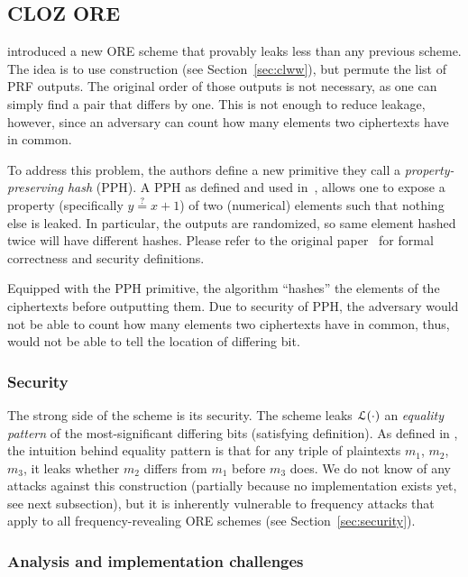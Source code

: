\subsection{CLOZ ORE}

	\textcite{parameter-hiding-ore} introduced a new ORE scheme that provably leaks less than any previous scheme.
	The idea is to use \textcite{clww-ore} construction (see Section~\ref{sec:clww}), but permute the list of PRF outputs.
	The original order of those outputs is not necessary, as one can simply find a pair that differs by one.
	This is not enough to reduce leakage, however, since an adversary can count how many elements two ciphertexts have in common.

	To address this problem, the authors define a new primitive they call a \emph{property-preserving hash} (PPH).
	A PPH as defined and used in~\cite{parameter-hiding-ore}, allows one to expose a property (specifically $y \overset{?}{=} x + 1$) of two (numerical) elements such that nothing else is leaked.
	In particular, the outputs are randomized, so same element hashed twice will have different hashes.
	Please refer to the original paper~\cite{parameter-hiding-ore} for formal correctness and security definitions.

	Equipped with the PPH primitive, the algorithm ``hashes'' the elements of the ciphertexts before outputting them.
	Due to security of PPH, the adversary would not be able to count how many elements two ciphertexts have in common, thus, would not be able to tell the location of differing bit.

	\subsubsection{Security}
		The strong side of the scheme is its security.
		The scheme leaks $\mathcal{L}(\cdot)$ an \emph{equality pattern} of the most-significant differing bits (satisfying \textcite{clww-ore} definition).
		As defined in \cite{parameter-hiding-ore}, the intuition behind equality pattern is that for any triple of plaintexts $m_1$, $m_2$, $m_3$, it leaks whether $m_2$ differs from $m_1$ before $m_3$ does. %
		We do not know of any attacks against this construction (partially because no implementation exists yet, see next subsection), but it is inherently vulnerable to frequency attacks that apply to all frequency-revealing ORE schemes (see Section~\ref{sec:security}).

	\subsubsection{Analysis and implementation challenges}

